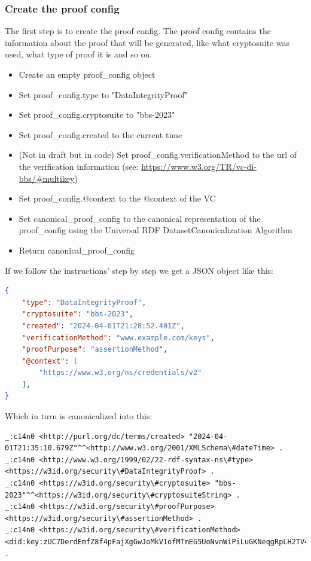 \documentclass[
	a4paper               %
	,bibliography=totoc   %
	,listof=totoc         %
	,monolingual
	twoside=false,
]{bfhthesis}              %
\begin{document}
\subsubsection{Create the proof config}
The first step is to create the proof config.
The proof config contains the information about the proof that will be generated, like what cryptosuite was used, what type of proof it is and so on.

\begin{itemize}
	\item Create an empty proof\_config object
	\item Set proof\_config.type to "DataIntegrityProof"
	\item Set proof\_config.cryptosuite to "bbs-2023"
	\item Set proof\_config.created to the current time
	\item (Not in draft but in code) Set proof\_config.verificationMethod to the url of the verification information (see: \url{https://www.w3.org/TR/vc-di-bbs/#multikey})
	\item Set proof\_config.@context to the @context of the VC
	\item Set canonical\_proof\_config to the canonical representation of the proof\_config using the Universal RDF DatasetCanonicalization Algorithm\cite{rdf}
	\item Return canonical\_proof\_config
\end{itemize}

If we follow the instructions' step by step we get a JSON object like this:
\begin{lstlisting}[language=json,firstnumber=1,caption={Example VC},captionpos=b]
{
	"type": "DataIntegrityProof",
	"cryptosuite": "bbs-2023",
	"created": "2024-04-01T21:28:52.401Z",
	"verificationMethod": "www.example.com/keys",
	"proofPurpose": "assertionMethod",
	"@context": [
		"https://www.w3.org/ns/credentials/v2"
	],
}
\end{lstlisting}

Which in turn is canonicalized into this:

\begin{lstlisting}[language=canon,firstnumber=1,caption={Example VC canonicalized},captionpos=b]
_:c14n0 <http://purl.org/dc/terms/created> "2024-04-01T21:35:10.679Z"^^<http://www.w3.org/2001/XMLSchema\#dateTime> .
_:c14n0 <http://www.w3.org/1999/02/22-rdf-syntax-ns\#type> <https://w3id.org/security\#DataIntegrityProof> .
_:c14n0 <https://w3id.org/security\#cryptosuite> "bbs-2023"^^<https://w3id.org/security\#cryptosuiteString> .
_:c14n0 <https://w3id.org/security\#proofPurpose> <https://w3id.org/security\#assertionMethod> .
_:c14n0 <https://w3id.org/security\#verificationMethod> <did:key:zUC7DerdEmfZ8f4pFajXgGwJoMkV1ofMTmEG5UoNvnWiPiLuGKNeqgRpLH2TV4Xe5mJ2cXV76gRN7LFQwapF1VFu6x2yrr5ci1mXqC1WNUrnHnLgvfZfMH7h6xP6qsf9EKRQrPQ\#zUC7DerdEmfZ8f4pFajXgGwJoMkV1ofMTmEG5UoNvnWiPiLuGKNeqgRpLH2TV4Xe5mJ2cXV76gRN7LFQwapF1VFu6x2yrr5ci1mXqC1WNUrnHnLgvfZfMH7h6xP6qsf9EKRQrPQ> .
\end{lstlisting}
\end{document}
